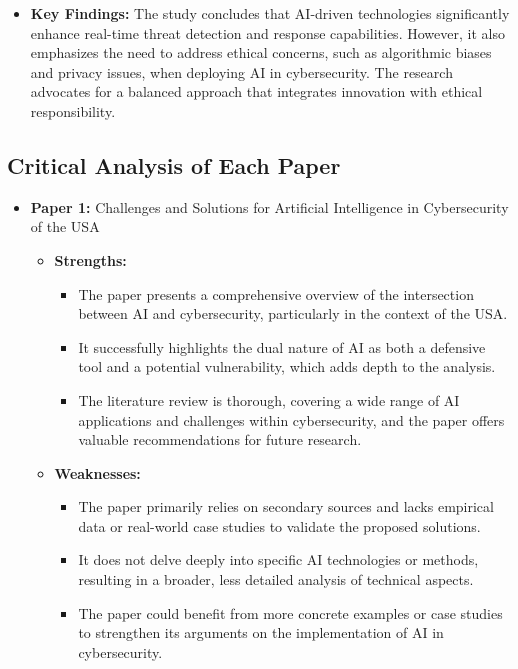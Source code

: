 \documentclass{article}  %
\begin{document}
\begin{itemize}
\begin{itemize}
        \item \textbf{Key Findings:} The study concludes that AI-driven technologies significantly enhance real-time threat detection and response capabilities. However, it also emphasizes the need to address ethical concerns, such as algorithmic biases and privacy issues, when deploying AI in cybersecurity. The research advocates for a balanced approach that integrates innovation with ethical responsibility.
    \end{itemize}
\end{itemize}

\subsection{Critical Analysis of Each Paper}
\begin{itemize}
    \item \textbf{Paper 1:} Challenges and Solutions for Artificial Intelligence in Cybersecurity of the USA
    \begin{itemize}
        \item \textbf{Strengths:} 
        \begin{itemize}
            \item The paper presents a comprehensive overview of the intersection between AI and cybersecurity, particularly in the context of the USA. 
            \item It successfully highlights the dual nature of AI as both a defensive tool and a potential vulnerability, which adds depth to the analysis.
            \item The literature review is thorough, covering a wide range of AI applications and challenges within cybersecurity, and the paper offers valuable recommendations for future research.
        \end{itemize}
        \item \textbf{Weaknesses:} 
        \begin{itemize}
            \item The paper primarily relies on secondary sources and lacks empirical data or real-world case studies to validate the proposed solutions.
            \item It does not delve deeply into specific AI technologies or methods, resulting in a broader, less detailed analysis of technical aspects.
            \item The paper could benefit from more concrete examples or case studies to strengthen its arguments on the implementation of AI in cybersecurity.

\end{itemize}
\end{itemize}
\end{itemize}
\end{document}
